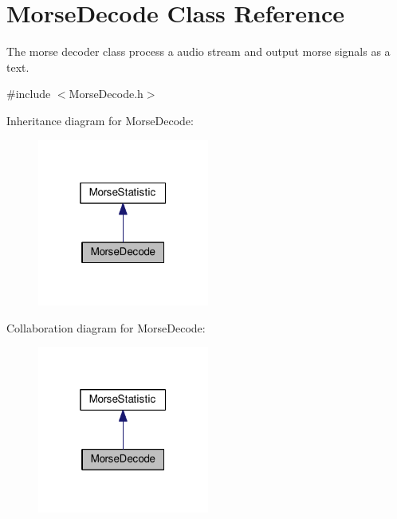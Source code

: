 \hypertarget{classMorseDecode}{}\section{Morse\+Decode Class Reference}
\label{classMorseDecode}


The morse decoder class process a audio stream and output morse signals as a text.  




{\ttfamily \#include $<$Morse\+Decode.\+h$>$}



Inheritance diagram for Morse\+Decode\+:
\nopagebreak
\begin{figure}[H]
\begin{center}
\leavevmode
\includegraphics[width=160pt]{classMorseDecode__inherit__graph}
\end{center}
\end{figure}


Collaboration diagram for Morse\+Decode\+:
\nopagebreak
\begin{figure}[H]
\begin{center}
\leavevmode
\includegraphics[width=160pt]{classMorseDecode__coll__graph}
\end{center}
\end{figure}
